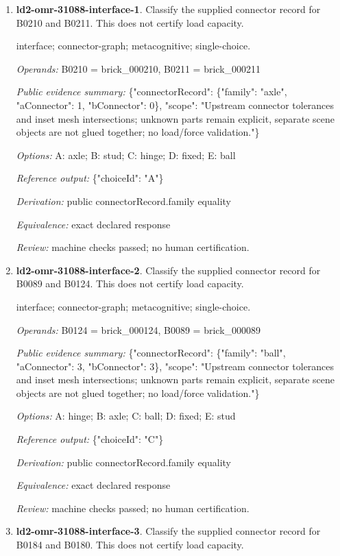 \begin{enumerate}
\item \textbf{ld2-omr-31088-interface-1}. Classify the supplied connector record for B0210 and B0211. This does not certify load capacity.
\par{\small interface; connector-graph; metacognitive; single-choice.\par\textit{Operands:} B0210 = brick\_000210, B0211 = brick\_000211\par\textit{Public evidence summary:} \{"connectorRecord": \{"family": "axle", "aConnector": 1, "bConnector": 0\}, "scope": "Upstream connector tolerances and inset mesh intersections; unknown parts remain explicit, separate scene objects are not glued together; no load/force validation."\}\par\textit{Options:} A: axle; B: stud; C: hinge; D: fixed; E: ball\par\textit{Reference output:} \{"choiceId": "A"\}\par\textit{Derivation:} public connectorRecord.family equality\par\textit{Equivalence:} exact declared response\par\textit{Review:} machine checks passed; no human certification.}
\item \textbf{ld2-omr-31088-interface-2}. Classify the supplied connector record for B0089 and B0124. This does not certify load capacity.
\par{\small interface; connector-graph; metacognitive; single-choice.\par\textit{Operands:} B0124 = brick\_000124, B0089 = brick\_000089\par\textit{Public evidence summary:} \{"connectorRecord": \{"family": "ball", "aConnector": 3, "bConnector": 3\}, "scope": "Upstream connector tolerances and inset mesh intersections; unknown parts remain explicit, separate scene objects are not glued together; no load/force validation."\}\par\textit{Options:} A: hinge; B: axle; C: ball; D: fixed; E: stud\par\textit{Reference output:} \{"choiceId": "C"\}\par\textit{Derivation:} public connectorRecord.family equality\par\textit{Equivalence:} exact declared response\par\textit{Review:} machine checks passed; no human certification.}
\item \textbf{ld2-omr-31088-interface-3}. Classify the supplied connector record for B0184 and B0180. This does not certify load capacity.

\end{enumerate}
